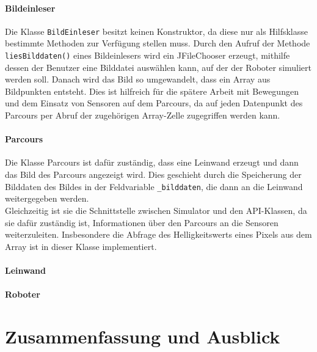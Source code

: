 \documentclass[paper=a4, pagesize, DIV=calc, BCOR=12.5mm, twoside=on, onecolumn=on, open = any, titlepage =on, parskip =half-, headsepline = on, footsepline = on, chapterprefix = on, appendixprefix = off, fontsize = 12pt, numbers = noenddot, abstract = on]{scrbook}
\numberwithin{equation}{chapter}
\theoremstyle{definition}
\theoremstyle{plain}
\theoremstyle{plain}
\theoremstyle{remark}
\theoremstyle{plain}
\theoremstyle{plain}
\begin{document}
\subsubsection{Bildeinleser}
Die Klasse \texttt{BildEinleser} besitzt keinen Konstruktor, da diese nur als Hilfsklasse bestimmte Methoden zur Verfügung stellen muss. Durch den Aufruf der Methode\\
\texttt{liesBilddaten()} eines Bildeinlesers wird ein JFileChooser erzeugt, mithilfe dessen der Benutzer eine Bilddatei auswählen kann, auf der der Roboter simuliert werden soll. Danach wird das Bild so umgewandelt, dass ein Array aus Bildpunkten entsteht. Dies ist hilfreich für die spätere Arbeit mit Bewegungen und dem Einsatz von Sensoren auf dem Parcours, da auf jeden Datenpunkt des Parcours per Abruf der zugehörigen Array-Zelle zugegriffen werden kann.
\subsubsection{Parcours}
Die Klasse Parcours ist dafür zuständig, dass eine Leinwand erzeugt und dann das Bild des Parcours angezeigt wird. Dies geschieht durch die Speicherung der Bilddaten des Bildes in der Feldvariable \texttt{{\_}bilddaten}, die dann an die Leinwand weitergegeben werden.\\

Gleichzeitig ist sie die Schnittstelle zwischen Simulator und den API-Klassen, da sie dafür zuständig ist, Informationen über den Parcours an die Sensoren weiterzuleiten. Insbesondere die Abfrage des Helligkeitswerts eines Pixels aus dem Array ist in dieser Klasse implementiert.
\subsubsection{Leinwand}

\subsubsection{Roboter}

\newpage
\chapter{Zusammenfassung und Ausblick}
\end{document}
